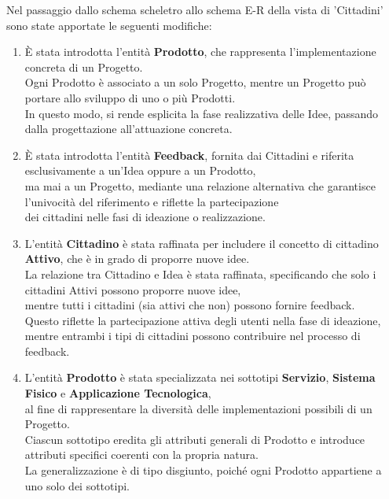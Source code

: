 \documentclass{article}
\begin{document}
 \begin{par}
    Nel passaggio dallo schema scheletro allo schema E-R della vista di ’Cittadini’ sono state apportate le seguenti modifiche:
    \begin{enumerate}
        \item È stata introdotta l’entità \textbf{Prodotto}, che rappresenta l’implementazione concreta di un Progetto.\\
        Ogni Prodotto è associato a un solo Progetto, mentre un Progetto può portare allo sviluppo di uno o più Prodotti.\\
        In questo modo, si rende esplicita la fase realizzativa delle Idee, passando dalla progettazione all’attuazione concreta.
        
        \item È stata introdotta l’entità \textbf{Feedback}, fornita dai Cittadini e riferita esclusivamente a un’Idea oppure a un Prodotto,\\
        ma mai a un Progetto, mediante una relazione alternativa che garantisce l’univocità del riferimento e riflette la partecipazione\\
        dei cittadini nelle fasi di ideazione o realizzazione.
        
        \item L'entità \textbf{Cittadino} è stata raffinata per includere il concetto di cittadino \textbf{Attivo}, che è in grado di proporre nuove idee.\\
        La relazione tra Cittadino e Idea è stata raffinata, specificando che solo i cittadini Attivi possono proporre nuove idee,\\
        mentre tutti i cittadini (sia attivi che non) possono fornire feedback.\\
        Questo riflette la partecipazione attiva degli utenti nella fase di ideazione, mentre entrambi i tipi di cittadini possono contribuire nel processo di feedback.
        
        \item L’entità \textbf{Prodotto} è stata specializzata nei sottotipi \textbf{Servizio}, \textbf{Sistema Fisico} e \textbf{Applicazione Tecnologica},\\
        al fine di rappresentare la diversità delle implementazioni possibili di un Progetto.\\
        Ciascun sottotipo eredita gli attributi generali di Prodotto e introduce attributi specifici coerenti con la propria natura.\\
        La generalizzazione è di tipo disgiunto, poiché ogni Prodotto appartiene a uno solo dei sottotipi.
        

\end{enumerate}
\end{par}
\end{document}
